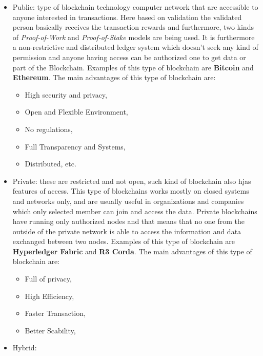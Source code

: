 \begin{itemize}
    \item {Public}: type of blockchain technology computer network that are accessible to anyone interested in transactions. Here based on validation the validated
          person basically receives the transaction rewards and furthermore, two kinds of \textit{Proof-of-Work} and \textit{Proof-of-Stake} models are being used.
          It is furthermore a non-restrictive and distributed ledger system which doesn't seek any kind of permission and anyone having access can be authorized one to get
          data or part of the Blockchain. Examples of this type of blockchain are \textbf{Bitcoin} and \textbf{Ethereum}. The main advantages of this type of blockchain are:
          \begin{itemize}
              \item High security and privacy,
              \item Open and Flexible Environment,
              \item No regulations,
              \item Full Transparency and Systems,
              \item Distributed, etc.
          \end{itemize}

    \item {Private}: these are restricted and not open, such kind of blockchain also hjas features of access. This type of blockchains works mostly on closed systems and networks only, and are usually
          useful in organizations and companies which only selected member can join and access the data. Private blockchains have running only authorized nodes and that means that no one from the outside
          of the private network is able to access the information and data exchanged between two nodes. Examples of this type of blockchain are \textbf{Hyperledger Fabric} and \textbf{R3 Corda}.
          The main advantages of this type of blockchain are:
          \begin{itemize}
              \item Full of privacy,
              \item High Efficiency,
              \item Faster Transaction,
              \item Better Scability,
          \end{itemize}

    \item {Hybrid}:
\end{itemize}

